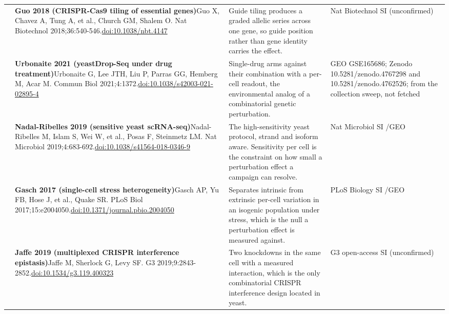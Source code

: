 \begin{landscape}
\begin{longtable}{@{}r@{\hspace{4pt}} L{86mm} L{92mm} L{62mm}@{}}
 & \textbf{Guo 2018 (CRISPR-Cas9 tiling of essential genes)}\newline Guo X, Chavez A, Tung A, et al., Church GM, Shalem O. Nat Biotechnol 2018;36:540-546.\newline \href{https://doi.org/10.1038/nbt.4147}{doi:10.1038/\allowbreak nbt.4147} & Guide tiling produces a graded allelic series across one gene, so guide position rather than gene identity carries the effect. & Nat Biotechnol SI (unconfirmed) \\
 & \textbf{Urbonaite 2021 (yeastDrop-Seq under drug treatment)}\newline Urbonaite G, Lee JTH, Liu P, Parras GG, Hemberg M, Acar M. Commun Biol 2021;4:1372.\newline \href{https://doi.org/10.1038/s42003-021-02895-4}{doi:10.1038/\allowbreak s42003-021-02895-4} & Single-drug arms against their combination with a per-cell readout, the environmental analog of a combinatorial genetic perturbation. & GEO GSE165686; Zenodo 10.5281/\allowbreak zenodo.4767298 and 10.5281/\allowbreak zenodo.4762526; from the collection sweep, not fetched \\
 & \textbf{Nadal-Ribelles 2019 (sensitive yeast scRNA-seq)}\newline Nadal-Ribelles M, Islam S, Wei W, et al., Posas F, Steinmetz LM. Nat Microbiol 2019;4:683-692.\newline \href{https://doi.org/10.1038/s41564-018-0346-9}{doi:10.1038/\allowbreak s41564-018-0346-9} & The high-sensitivity yeast protocol, strand and isoform aware. Sensitivity per cell is the constraint on how small a perturbation effect a campaign can resolve. & Nat Microbiol SI /\allowbreak  GEO \\
 & \textbf{Gasch 2017 (single-cell stress heterogeneity)}\newline Gasch AP, Yu FB, Hose J, et al., Quake SR. PLoS Biol 2017;15:e2004050.\newline \href{https://doi.org/10.1371/journal.pbio.2004050}{doi:10.1371/\allowbreak journal.pbio.2004050} & Separates intrinsic from extrinsic per-cell variation in an isogenic population under stress, which is the null a perturbation effect is measured against. & PLoS Biology SI /\allowbreak  GEO \\
 & \textbf{Jaffe 2019 (multiplexed CRISPR interference epistasis)}\newline Jaffe M, Sherlock G, Levy SF. G3 2019;9:2843-2852.\newline \href{https://doi.org/10.1534/g3.119.400323}{doi:10.1534/\allowbreak g3.119.400323} & Two knockdowns in the same cell with a measured interaction, which is the only combinatorial CRISPR interference design located in yeast. & G3 open-access SI (unconfirmed) \\

\end{longtable}
\end{landscape}

